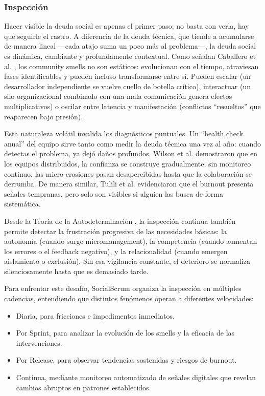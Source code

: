 \FloatBarrier

\subsubsection{Inspección}

Hacer visible la deuda social es apenas el primer paso; no basta con verla, hay que seguirle el rastro.
A diferencia de la deuda técnica, que tiende a acumularse de manera lineal —cada atajo suma un poco más al problema—, la deuda social es dinámica, cambiante y profundamente contextual.
Como señalan Caballero et al. \cite{caballero2022communitysmells}, los community smells no son estáticos: evolucionan con el tiempo, atraviesan fases identificables y pueden incluso transformarse entre sí.
Pueden escalar (un desarrollador independiente se vuelve cuello de botella crítico), interactuar (un silo organizacional combinado con una mala comunicación genera efectos multiplicativos) o oscilar entre latencia y manifestación (conflictos ``resueltos'' que reaparecen bajo presión).

Esta naturaleza volátil invalida los diagnósticos puntuales.
Un ``health check anual'' del equipo sirve tanto como medir la deuda técnica una vez al año: cuando detectas el problema, ya dejó daños profundos.
Wilson et al. \cite{wilson_all_2006} demostraron que en los equipos distribuidos, la confianza se construye gradualmente; sin monitoreo continuo, las micro-erosiones pasan desapercibidas hasta que la colaboración se derrumba.
De manera similar, Tulili et al. \cite{tulili2022burnout} evidenciaron que el burnout presenta señales tempranas, pero solo son visibles si alguien las busca de forma sistemática.

Desde la Teoría de la Autodeterminación \cite{ryan_self-determination_2000}, la inspección continua también permite detectar la frustración progresiva de las necesidades básicas:
la autonomía (cuando surge micromanagement), la competencia (cuando aumentan los errores o el feedback negativo), y la relacionalidad (cuando emergen aislamiento o exclusión).
Sin esa vigilancia constante, el deterioro se normaliza silenciosamente hasta que es demasiado tarde.

Para enfrentar este desafío, SocialScrum organiza la inspección en múltiples cadencias, entendiendo que distintos fenómenos operan a diferentes velocidades:
\begin{itemize}
    \item Diaria, para fricciones e impedimentos inmediatos.
    \item Por Sprint, para analizar la evolución de los smells y la eficacia de las intervenciones.
    \item Por Release, para observar tendencias sostenidas y riesgos de burnout.
    \item Continua, mediante monitoreo automatizado de señales digitales que revelan cambios abruptos en patrones establecidos.
\end{itemize}

